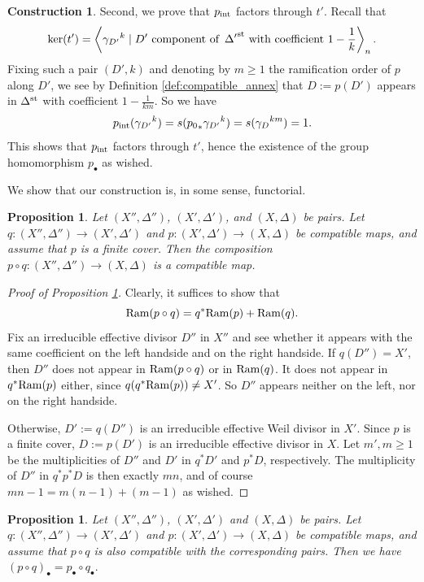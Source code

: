 \documentclass{amsart}
\newtheorem{proposition}[theorem]{Proposition}
\theoremstyle{definition}
\newtheorem{construction}[theorem]{Construction}
\theoremstyle{remark}
\numberwithin{equation}{section}
\begin{document}
\begin{construction}
\medskip

Second, we prove that $p_{\rm int}$ factors through $t'$. Recall that
$$\ker(t') = \left\langle {\gamma_{D'}}^k\mid D'\mbox{ component of }\,{\Delta'}^{\rm st}\mbox{ with coefficient }1-\frac{1}{k}\right\rangle_n.$$
Fixing such a pair $(D',k)$ and denoting by $m\ge 1$ the ramification order of $p$ along $D'$, we see by Definition \ref{def:compatible_annex} that $D:=p(D')$ appears in $\Delta^{\rm st}$ with coefficient $1-\frac{1}{km}$. So we have
$$p_{\rm int}({\gamma_{D'}}^k)=s({p_0}_*{\gamma_{D'}}^k)=s({\gamma_D}^{km})=1.$$
This shows that $p_{\rm int}$ factors through $t'$, hence the existence of the group homomorphism $p_{\bullet}$ as wished.
\end{construction}


We show that our construction is, in some sense, functorial.

\begin{proposition}\label{prop:can_compose}
Let $(X'',\Delta'')$, $(X',\Delta')$, and $(X,\Delta)$ be pairs. Let $q:(X'',\Delta'') \to (X',\Delta')$ and $p:(X',\Delta') \to (X,\Delta)$ be compatible maps, and assume that $p$ is a finite cover. Then the composition $p\circ q:(X'',\Delta'')\to (X,\Delta)$ is a compatible map.
\end{proposition}

\begin{proof}[Proof of Proposition \ref{prop:can_compose}]
Clearly, it suffices to show that
 $${\rm Ram}(p\circ q)=q^*{\rm Ram}(p)+{\rm Ram}(q).$$
Fix an irreducible effective divisor $D''$ in $X''$ and see whether it appears with the same coefficient on the left handside and on the right handside. 
If $q(D'')=X'$, then $D''$ does not appear in ${\rm Ram}(p\circ q)$ or in ${\rm Ram}(q)$. It does not appear in $q^*{\rm Ram}(p)$ either, since $q(q^*{\rm Ram}(p))\neq X'$. So $D''$ appears neither on the left, nor on the right handside.

Otherwise, $D':=q(D'')$ is an irreducible effective Weil divisor in $X'$. Since $p$ is a finite cover, $D:=p(D')$ is an irreducible effective divisor in $X$.
Let $m',m\ge 1$ be the multiplicities of $D''$ and $D'$ in $q^*D'$ and $p^*D$, respectively. The multiplicity of $D''$ in $q^*p^*D$ is then exactly $mn$, and of course $mn-1=m(n-1)+(m-1)$ as wished.
\end{proof}

\begin{proposition}\label{prop:functorialpf}
Let $(X'',\Delta'')$, $(X',\Delta')$ and $(X,\Delta)$ be pairs. Let $q:(X'',\Delta'') \to (X',\Delta')$ and $p:(X',\Delta') \to (X,\Delta)$ be compatible maps, and assume that $p\circ q$ is also compatible with the corresponding pairs. Then we have
$(p\circ q)_{\bullet}=p_{\bullet}\circ q_{\bullet}.$
\end{proposition}
\end{document}
